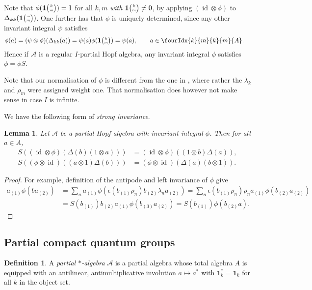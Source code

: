 \documentclass[10pt]{article}
\DeclareMathOperator{\id}{id}
\newcommand{\Grt}[3]{#1{\tiny {\begin{pmatrix} #2\\#3\end{pmatrix}}}}
\newcommand{\UnitC}[2]{\Grt{\mathbf{1}}{#1}{#2}}
\newcommand{\Gr}[5]{\fourIdx{#2}{#4}{#3}{#5}{#1}}%
\newtheorem{Lem}[Theorem]{Lemma}
\theoremstyle{definition}
\newtheorem{Def}[Theorem]{Definition}
\numberwithin{equation}{section}
\begin{document}
Note that $\phi(\UnitC{k}{m})=1$ for all $k,m$ \emph{with $\UnitC{k}{m}\neq 0$}, by applying $(\id\otimes \phi)$ to $\Delta_{kk}(\UnitC{m}{m})$. One further has that $\phi$ is uniquely determined, since any other invariant integral $\psi$ satisfies \begin{align*}  \phi(a)  &= (\psi \otimes
      \phi)(\Delta_{kk}(a)) = \psi(a)\phi(\UnitC{k}{m}) = \psi(a),\qquad a\in \Gr{A}{k}{k}{m}{m}.
    \end{align*}
Hence if $\mathscr{A}$ is a  regular  $I$-partial Hopf algebra, any invariant integral $\phi$ satisfies $\phi=\phi S$.

Note that our normalisation of $\phi$ is different from the one in \cite{Hay1}, where rather the $\lambda_k$ and $\rho_m$ were assigned weight one. That normalisation does however not make sense in case $I$ is infinite.

We have the following form of \emph{strong invariance}.

\begin{Lem} \label{lemma:strong-invariance}
  Let $\mathscr{A}$ be a partial Hopf algebra with invariant integral $\phi$. Then
  for all $a\in A$,
  \begin{align*}
    S\left(( \id\otimes
    \phi)(\Delta(b)(1 \otimes a))\right) &= (\id \otimes \phi)((1 \otimes b)\Delta(a)),\\  S\left((\phi \otimes
    \id)((a\otimes 1)\Delta(b))\right) &= (\phi \otimes \id)(\Delta(a)(b\otimes 1)).\end{align*}
\end{Lem}
\begin{proof}
 For example, definition of the antipode and left invariance of $\phi$ give
  \begin{align*}
    a_{(1)}\phi(ba_{(2)}) &= \sum_{n}
    a_{(1)}\phi(\epsilon(b_{(1)}\rho_{n})b_{(2)}\lambda_{n}a_{(2)}) 
= \sum_{n} \epsilon(b_{(1)}\rho_{n})\rho_{n}a_{(1)}\phi(b_{(2)}a_{(2)})
\\
&= S(b_{(1)})b_{(2)}a_{(1)}\phi(b_{(3)}a_{(2)}) =
S(b_{(1)})\phi(b_{(2)}a).  
  \end{align*}
\end{proof}


\subsection{Partial compact quantum groups}
 
\begin{Def} A \emph{partial $*$-algebra} $\mathscr{A}$ is a partial
  algebra whose total algebra $A$ is equipped with an antilinear,
  antimultiplicative involution $ a\mapsto
  a^*$ with $\mathbf{1}_k^*=\mathbf{1}_k$ for all $k$ in
  the object set. 
\end{Def} 
\end{document}
